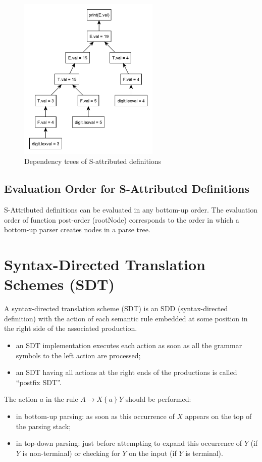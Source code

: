 \begin{figure}[H]
    \centerline{\includegraphics[width=0.6\textwidth]{img/14.pdf}}
    \caption{Dependency trees of S-attributed definitions}
\end{figure}

\subsection{Evaluation Order for S-Attributed Definitions}
S-Attributed definitions can be evaluated in any bottom-up order.
The evaluation order of function post-order (rootNode) corresponds to the order in which a bottom-up parser creates nodes in a parse tree.

\section{Syntax-Directed Translation Schemes (SDT)}
A syntax-directed translation scheme (SDT) is an SDD (syntax-directed definition) with the action of each semantic rule embedded at some position in the right side of the associated production.
\begin{itemize}
    \item an SDT implementation executes each action as soon as all the grammar symbols to the left action are processed;
    \item an SDT having all actions at the right ends of the productions is called ``postfix SDT''.
\end{itemize}

The action $a$ in the rule $A \to X\left\{a\right\}Y$ should be performed:
\begin{itemize}
    \item in bottom-up parsing: as soon as this occurrence of $X$ appears on the top of the parsing stack;
    \item in top-down parsing: just before attempting to expand this occurrence of $Y$ (if $Y$ is non-terminal) or checking for $Y$ on the input (if $Y$ is terminal).
\end{itemize}

